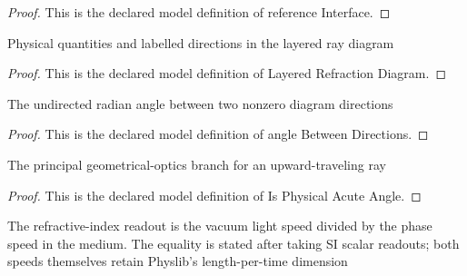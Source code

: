 \begin{proof}
  This is the declared model definition of reference Interface.
\end{proof}
\begin{definition}
  \label{def:physics:phyx-mini-0091:phyxminiproblems-problemphyxmini0091-layeredrefractiondiagram}
  Physical quantities and labelled directions in the layered ray diagram
\end{definition}
\begin{proof}
  This is the declared model definition of Layered Refraction Diagram.
\end{proof}
\begin{definition}
  \label{def:physics:phyx-mini-0091:phyxminiproblems-problemphyxmini0091-anglebetweendirections}
  The undirected radian angle between two nonzero diagram directions
\end{definition}
\begin{proof}
  This is the declared model definition of angle Between Directions.
\end{proof}
\begin{definition}
  \label{def:physics:phyx-mini-0091:phyxminiproblems-problemphyxmini0091-isphysicalacuteangle}
  The principal geometrical-optics branch for an upward-traveling ray
\end{definition}
\begin{proof}
  This is the declared model definition of Is Physical Acute Angle.
\end{proof}
\begin{definition}
  \label{def:physics:phyx-mini-0091:phyxminiproblems-problemphyxmini0091-modelsrefractiveindexfromphasespeed}
  The refractive-index readout is the vacuum light speed divided by the phase speed in the medium. The equality is stated after taking SI scalar readouts; both speeds themselves retain Physlib's length-per-time dimension
\end{definition}
